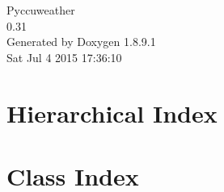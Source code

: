 \documentclass[twoside]{book}
\newcommand{\+}{\discretionary{\mbox{\scriptsize$\hookleftarrow$}}{}{}}
\newcommand{\clearemptydoublepage}{%
  \newpage{\pagestyle{empty}\cleardoublepage}%
}
\begin{document}
\hypersetup{pageanchor=false,
             bookmarks=true,
             bookmarksnumbered=true,
             pdfencoding=unicode
            }
\begin{titlepage}
\vspace*{7cm}
\begin{center}%
{\Large Pyccuweather \\[1ex]\large 0.\+31 }\\
\vspace*{1cm}
{\large Generated by Doxygen 1.8.9.1}\\
\vspace*{0.5cm}
{\small Sat Jul 4 2015 17:36:10}\\
\end{center}
\end{titlepage}
\clearemptydoublepage
\tableofcontents
\clearemptydoublepage
{}
\hypersetup{pageanchor=true}

\chapter{Hierarchical Index}

\chapter{Class Index}

\end{document}
